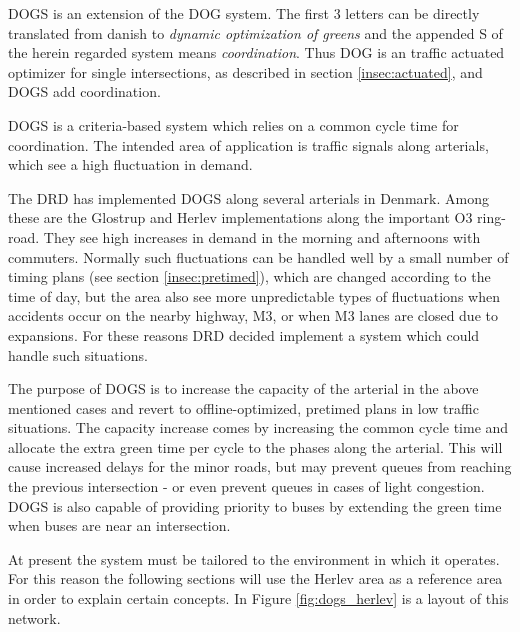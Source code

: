 \label{sec:dogs}

DOGS is an extension of the DOG system. The first 3 letters can be
directly translated from danish to \textit{dynamic optimization of
greens} and the appended S of the herein regarded system means
\textit{coordination}. Thus DOG is an traffic actuated optimizer for
single intersections, as described in section \ref{insec:actuated}, and
DOGS add coordination.

DOGS is a criteria-based system which relies on a common cycle time
for coordination. The intended area of application is traffic signals
along arterials, which see a high fluctuation in demand.

The DRD has implemented DOGS along several arterials in Denmark.
Among these are the Glostrup and Herlev implementations along the
important O3 ring-road. They see high increases in demand in the
morning and afternoons with commuters. Normally such fluctuations can
be handled well by a small number of timing plans (see section
\ref{insec:pretimed}), which are changed according to the time of day, but
the area also see more unpredictable types of fluctuations when
accidents occur on the nearby highway, M3, or when M3 lanes are closed
due to expansions. For these reasons DRD decided implement a system
which could handle such situations.

The purpose of DOGS is to increase the capacity of the arterial in the
above mentioned cases and revert to offline-optimized, pretimed plans
in low traffic situations. The capacity increase comes by increasing
the common cycle time and allocate the extra green time per cycle to
the phases along the arterial. This will cause increased delays for
the minor roads, but may prevent queues from reaching the previous
intersection - or even prevent queues in cases of light congestion.
DOGS is also capable of providing priority to buses by extending the
green time when buses are near an intersection.

At present the system must be tailored to the environment in which it
operates. For this reason the following sections will use the Herlev
area as a reference area in order to explain certain concepts. In
Figure \ref{fig:dogs_herlev} is a layout of this network.

